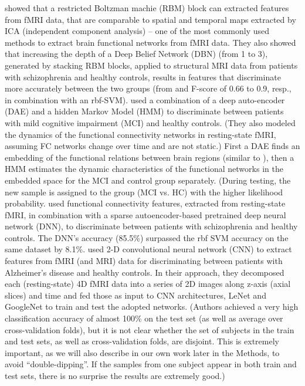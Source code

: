 \documentclass{article} %
\begin{document}
\citet{Plis2014} showed that a restricted Boltzman machie (RBM) block \citep{Hinton2002} can extracted features from fMRI data, that are comparable to spatial and temporal maps extracted by ICA (independent component analysis) – one of the most commonly used methods to extract brain functional networks from fMRI data. They also showed that increasing the depth of a Deep Belief Network (DBN) \citep{Hinton2006} (from 1 to 3), generated by stacking RBM blocks, applied to structural MRI data from patients with schizophrenia and healthy controls, results in features that discriminate more accurately between the two groups (from and F-score of 0.66 to 0.9, resp., in combination with an rbf-SVM).
\citet{Suk2016} used a combination of a deep auto-encoder (DAE) and a hidden Markov Model (HMM) to discriminate between patients with mild cognitive impairment (MCI) and healthy controls. (They also modeled the dynamics of the functional connectivity networks in resting-state fMRI, assuming FC networks change over time and are not static.) First a DAE finds an embedding of the functional relations between brain regions (similar to \citep{Plis2014}), then a HMM estimates the dynamic characteristics of the functional networks in the embedded space for the MCI and control group separately. (During testing, the new sample is assigned to the group (MCI vs. HC) with the higher likelihood probability. \citet{Kim2016} used functional connectivity features, extracted from resting-state fMRI, in combination with a sparse autoencoder-based pretrained deep neural network (DNN), to discriminate between patients with schizophrenia and healthy controls. The DNN’s accuracy (85.5\%) surpassed the rbf SVM accuracy on the same dataset by 8.1\%. \citet{Sarraf2016} used 2-D convolutional neural network (CNN) to extract features from fMRI (and MRI) data for discriminating between patients with Alzheimer’s disease and healthy controls. In their approach, they decomposed each (resting-state) 4D fMRI data into a series of 2D images along z-axis (axial slices) and time and fed those as input to CNN architectures, LeNet \citep{Lecun1998} and GoogleNet \citep{Szegedy2015} to train and test the adopted networks. (Authors achieved a very high classification accuracy of almost 100\% on the test set (as well as average over cross-validation folds), but it is not clear whether the set of subjects in the train and test sets, as well as cross-validation folds, are disjoint. This is extremely important, as we will also describe in our own work later in the Methods, to avoid “double-dipping”. If the samples from one subject appear in both train and test sets, there is no surprise the results are extremely good.)
\end{document}
